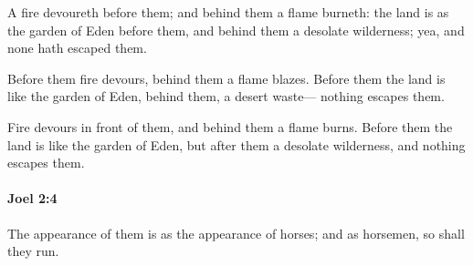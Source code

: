 			\begin{versebox}
					\item[BHS] 
					\item[LXX] 
					\item[ASV] A fire devoureth before them; and behind them a flame burneth: the land is as the garden of Eden before them, and behind them a desolate wilderness; yea, and none hath escaped them.
					\item[NIV] Before them fire devours, behind them a flame blazes. Before them the land is like the garden of Eden, behind them, a desert waste— nothing escapes them.
					\item[NRSV] Fire devours in front of them, and behind them a flame burns. Before them the land is like the garden of Eden, but after them a desolate wilderness, and nothing escapes them.
			\end{versebox}

		\paragraph{Joel 2:4} %
			\label{JOEL-2-4}

			The appearance of them is as the appearance of horses; and as horsemen, so shall they run.

